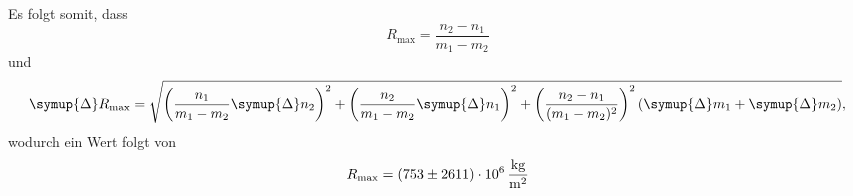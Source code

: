 Es folgt somit, dass
\begin{equation}
    R_\text{max} = \frac{n_2-n_1}{m_1-m_2}
\end{equation}
und
\begin{equation}
    \symup{\Delta}R_\text{max} = \sqrt{
        \left( \frac{n_1}{m_1-m_2}\symup{\Delta}n_2 \right) ^2 +
        \left( \frac{n_2}{m_1-m_2}\symup{\Delta}n_1 \right) ^2 +
        \left( \frac{n_2-n_1}{(m_1-m_2)^2}\right) ^2 \left(\symup{\Delta}m_1 + \symup{\Delta}m_2 \right)
        },
\end{equation}
wodurch ein Wert folgt von
\begin{equation}
    R_\text{max} = \SI{753\pm2611e6}{\kg\per\meter\squared}
\end{equation}
